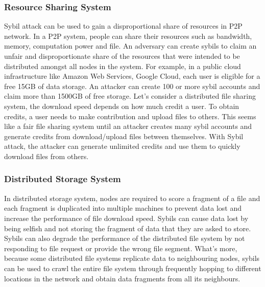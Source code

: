 \documentclass[conference]{IEEEtran}
\begin{document}
\subsubsection{Resource Sharing System}
Sybil attack can be used to gain a disproportional share of resources in P2P network. 
In a P2P system, people can share their resources such as bandwidth, memory, computation power and file. 
An adversary can create sybils to claim an unfair and disproportionate share of the resources that were intended to be 
distributed amongst all nodes in the system. For example, in a public cloud infrastructure like Amazon Web Services, Google Cloud, 
each user is eligible for a free 15GB of data storage. An attacker can create 100 or more sybil accounts and claim more than 1500GB of free storage.
Let's consider a distributed file sharing system, the download speed depends on how much credit a user. To obtain credits, a user needs to make contribution and upload files to others.
This seems like a fair file sharing system until an attacker creates many sybil accounts and generate credits from download/upload files between themselves.
With Sybil attack, the attacker can generate unlimited credits and use them to quickly download files from others.


\subsubsection{Distributed Storage System}
In distributed storage system, nodes are required to score a fragment of a file and each fragment is duplicated into multiple machines to prevent data lost 
and increase the performance of file download speed.
Sybils can cause data lost by being selfish and not storing the fragment of data that they are asked to store. 
Sybils can also degrade the performance of the distributed file system by not responding to file request or provide the wrong file segment. 
What's more, because some distributed file systems replicate data to neighbouring nodes, sybils can be used to crawl the entire file system through frequently 
hopping to different locations in the network and obtain data fragments from all its neighbours.\cite{Lian07anempirical}\cite{wolchok09defeatingvanish}
\end{document}
